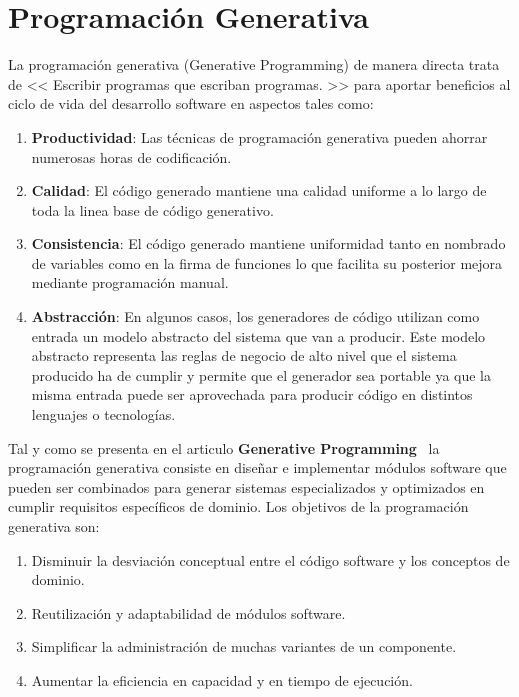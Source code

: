 \documentclass[a4paper,11pt]{book}
\begin{document}
\section{Programación Generativa}

La programación generativa (Generative Programming) de manera directa trata de << Escribir programas que escriban programas. >>  para aportar beneficios al ciclo de vida del desarrollo software en aspectos tales como: 

\begin{enumerate}
\item \textbf{Productividad}:  Las técnicas de programación generativa pueden ahorrar numerosas horas de codificación.  
\item \textbf{Calidad}: El código generado mantiene una calidad uniforme a lo largo de toda la linea base de código generativo.
\item \textbf{Consistencia}: El código generado mantiene uniformidad tanto en nombrado de variables como en la firma de funciones lo que facilita su posterior mejora mediante programación manual. 
\item \textbf{Abstracción}: En algunos casos, los generadores de código utilizan como entrada un modelo abstracto del sistema que van a producir. Este modelo abstracto representa las reglas de negocio de alto nivel que el sistema producido ha de cumplir y permite que el generador sea portable ya que la misma entrada puede ser aprovechada para producir código en distintos lenguajes o tecnologías. 
\end{enumerate}

Tal y como se presenta en el articulo \textbf{Generative Programming}~\cite{gp} la programación generativa consiste en diseñar e implementar módulos software que pueden ser combinados para generar sistemas especializados y  optimizados en cumplir requisitos específicos de dominio. Los objetivos de la programación generativa son:

\begin{enumerate}
\item Disminuir la desviación conceptual entre el código software y los conceptos de dominio.
\item Reutilización y adaptabilidad de módulos software.
\item Simplificar la administración de muchas variantes de un componente.
\item Aumentar la eficiencia  en capacidad y en tiempo de ejecución.
\end{enumerate}
\end{document}
